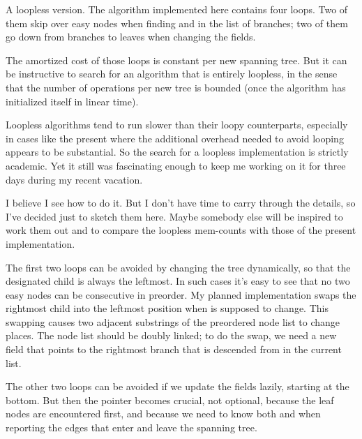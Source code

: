 A loopless version. The algorithm implemented here contains four
loops. Two of them skip over easy nodes when finding  and 
in the list of branches; two of them go down from branches to leaves
when changing the  fields.

The amortized cost of those loops is constant per new spanning tree.
But it can be instructive to search for an algorithm that is entirely
loopless, in the sense that the number of operations per new tree
is bounded (once the algorithm has initialized itself in linear time).

Loopless algorithms tend to run slower than their loopy counterparts,
especially in cases like the present where the additional overhead
needed to avoid looping appears to be substantial. So the search
for a loopless implementation is strictly academic. Yet it still
was fascinating enough to keep me working on it for three days
during my recent vacation.

I believe I see how to do it. But I don't have time to carry through
the details, so I've decided just to sketch them here. Maybe somebody
else will be inspired to work them out and to compare the
loopless mem-counts with those of the present implementation.

The first two loops can be avoided by changing the tree dynamically,
so that the designated child is always the leftmost. In such cases
it's easy to see that no two easy nodes can be consecutive in preorder.
My planned implementation swaps the rightmost child into the leftmost
position when  is supposed to change. This swapping causes
two
adjacent substrings of the preordered node list to change places.
The node list should be doubly linked;
to do the swap, we need a new field  that points to the
rightmost branch that is descended from  in the current list.

The other two loops can be avoided if we update the  fields lazily,
starting at the bottom.  But then the pointer  becomes
crucial, not optional, because the leaf nodes are encountered first,
and because we need to know both  and  when
reporting the edges that enter and leave the spanning tree.

